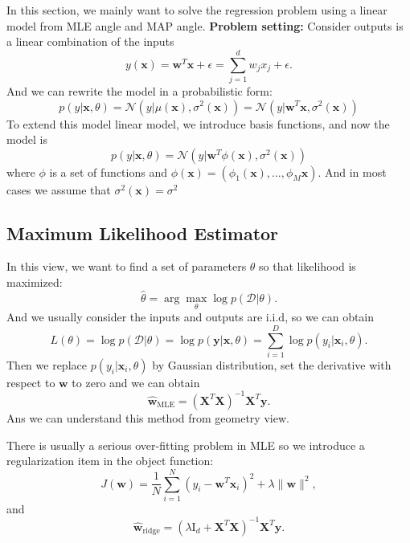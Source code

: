 \documentclass{article}
\newcommand{\normD}{\mathcal{N}}
\newcommand{\mrm}{\mathrm}
\newcommand{\mbf}{\mathbf}
\newcommand{\mcal}{\mathcal}
\begin{document}
In this section, we mainly want to solve the regression problem using a linear model from MLE angle and MAP angle. 
\textbf{Problem setting:} Consider outputs is a linear combination of the inputs 
\begin{equation}
    y(\mbf x) = \mbf w^T\mbf x+\epsilon = \sum_{j=1}^{d}w_jx_j+\epsilon.
\end{equation}
And we can rewrite the model in a probabilistic form:
\begin{equation}
    p(y|\mbf x, \theta) = \normD(y|\mu(\mbf x),\sigma^2(\mbf x)) = \normD(y|\mbf w^T\mbf x, \sigma^2(\mbf x))
\end{equation}
To extend this model linear model, we introduce basis functions, and now the model is 
\begin{equation}
    p(y|\mbf x,\theta) = \normD(y|\mbf w^T\phi(\mbf x),\sigma^2(\mbf x))
\end{equation}
where $\phi$ is a set of functions and $\phi(\mbf x) = (\phi_1(\mbf x), \dots, \phi_M\mbf x)$. And in most cases we assume that $\sigma^2(\mbf x) = \sigma^2$
\subsection*{Maximum Likelihood Estimator}
In this view, we want to find a set of parameters $\theta$ so that likelihood is maximized:
\begin{equation}
    \hat{\theta}=\arg\max_{\theta}\log p(\mathcal D|\theta). 
\end{equation}
And we usually consider the inputs and outputs are i.i.d, so we can obtain
\begin{equation}
    L(\theta) = \log p(\mcal D|\theta)=\log p(\mbf y|\mbf x, \theta) =\sum_{i=1}^{D}\log p(y_i|\mbf x_i,\theta).
\end{equation}
Then we replace $p(y_i|\mbf x_i, \theta)$ by Gaussian distribution, set the derivative with respect to $\mbf w$ to zero and we can obtain
\begin{equation}
    \hat{\mbf w}_{\mrm{MLE}} = (\mbf X^T\mbf X)^{-1}\mbf X^T\mbf y.
\end{equation}
Ans we can understand this method from geometry view. 

There is usually a serious over-fitting problem in MLE so we introduce a regularization item in the object function:
\begin{equation}
    J(\mbf w) = \frac{1}{N}\sum_{i=1}^{N}(y_i-\mbf w^T \mbf x_i)^2+\lambda\|\mbf w\|^2,
\end{equation}
and 
\begin{equation}
    \hat{\mbf w}_{\mrm{ridge}} = (\lambda \mrm I_d +\mbf X^T\mbf X)^{-1}\mbf X^T\mbf y.
\end{equation}
\end{document}
